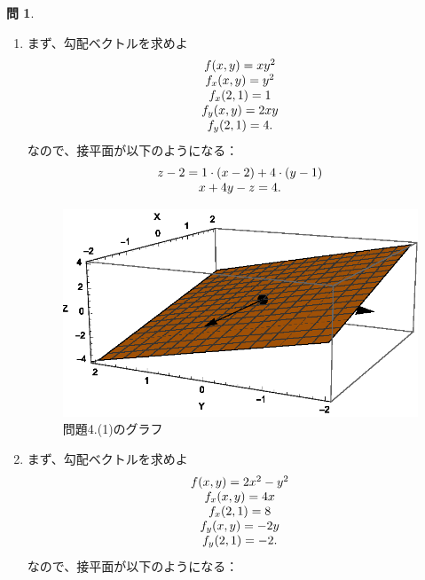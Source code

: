 \documentclass[12pt]{article} %
\theoremstyle{definition}
\newtheorem{question}{問}
\begin{document}
\begin{question}
	\begin{enumerate}[(1)]
		\item 
			まず、勾配ベクトルを求めよ
			\begin{equation*}
				\begin{array}[]{c}
					f(x,y)=xy^2\\
					f_x(x,y)=y^2\\f_x(2,1)=1\\
					f_y(x,y)=2xy\\f_y(2,1)=4.
				\end{array}
			\end{equation*}
				なので、接平面が以下のようになる：\begin{equation*}
					\begin{array}[]{c}
						z-2=1\cdot(x-2)+4\cdot(y-1)\\
						x+4y-z=4.
					\end{array}
				\end{equation*}
			\begin{figure}[h!]
				\centering
				\includegraphics{4d1}
				\caption{問題4.(1)のグラフ}
			\end{figure}
		\item 
			まず、勾配ベクトルを求めよ
			\begin{equation*}
				\begin{array}[]{c}
					f(x,y)=2x^2-y^2\\
					f_x(x,y)=4x\\f_x(2,1)=8\\
					f_y(x,y)=-2y\\f_y(2,1)=-2.
				\end{array}
			\end{equation*}
				なので、接平面が以下のようになる：\begin{equation*}

\end{equation*}
\end{enumerate}
\end{question}
\end{document}
